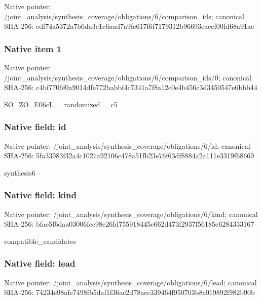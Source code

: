 \documentclass[10pt,a4paper]{article}
\begin{document}
Native pointer: /joint\_analysis/synthesi\allowbreak{}s\_coverage/obligations/6\allowbreak{}/comparison\_ids; canonical SHA-256: edf74a5372a7b6da3c1c6aad\allowbreak{}7a9fe617f6f7179312b96693\allowbreak{}eaccf00fd68a91ac



\subsubsection{Native item 1}


Native pointer: /joint\_analysis/synthesi\allowbreak{}s\_coverage/obligations/6\allowbreak{}/comparison\_ids/0; canonical SHA-256: c4bf7706f0a9014dfe772bab\allowbreak{}bf4c7341a7f8a12e0e4b456c\allowbreak{}3d3450547e6bbb44


SO\_ZO\_E06cL\_\_randomized\_\_c5


\subsubsection{Native field: id}


Native pointer: /joint\_analysis/synthesi\allowbreak{}s\_coverage/obligations/6\allowbreak{}/id; canonical SHA-256: 5fa33983f32a4c1027a92106\allowbreak{}c478a51fb23e76f63df8884a\allowbreak{}2a111e3319f68669


synthesis6


\subsubsection{Native field: kind}


Native pointer: /joint\_analysis/synthesi\allowbreak{}s\_coverage/obligations/6\allowbreak{}/kind; canonical SHA-256: bfae5f6daa03006fec98e26f\allowbreak{}d755918445e662d473f2937f\allowbreak{}56185e6284333167


compatible\_candidates


\subsubsection{Native field: lead}


Native pointer: /joint\_analysis/synthesi\allowbreak{}s\_coverage/obligations/6\allowbreak{}/lead; canonical SHA-256: 74234e98afe7498fb5daf1f3\allowbreak{}6ac2d78acc339464f950703b\allowbreak{}8c019892f982b90b
\end{document}
